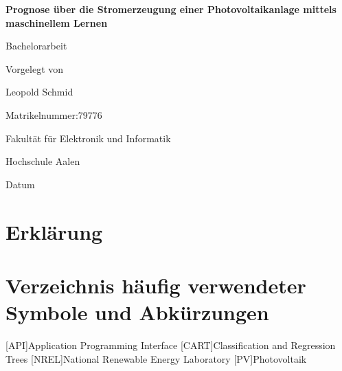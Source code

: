 \documentclass[12pt, a4paper]{article}
\begin{document}
\begin{titlepage}
    \begin{center}
        \vspace*{1cm}
        
        \textbf{\LARGE{Prognose über die Stromerzeugung einer Photovoltaikanlage mittels maschinellem Lernen}}
        
        \vspace{0.5cm}
        \Large{Bachelorarbeit}
        
        \vspace{1.5cm}
        \Large{Vorgelegt von}
        
        \vspace{0.5cm}
        \Large{Leopold Schmid}
        
        \vspace{1.5cm}
        \Large{Matrikelnummer:79776}
        
        \vfill
        
        \Large{Fakultät für Elektronik und Informatik}
        
        \vspace{0.5cm}
        \Large{Hochschule Aalen}
        
        \vspace{1.5cm}
        \Large{Datum}
        
    \end{center}
\end{titlepage}


\newpage

\section*{Erklärung}


\newpage


\section*{Verzeichnis häufig verwendeter Symbole und Abkürzungen}

\begin{acronym}
[API]{Application Programming Interface}
[CART]{Classification and Regression Trees}
[NREL]{National Renewable Energy Laboratory}
[PV]{Photovoltaik}
\end{acronym}

\newpage

\tableofcontents
\end{document}

